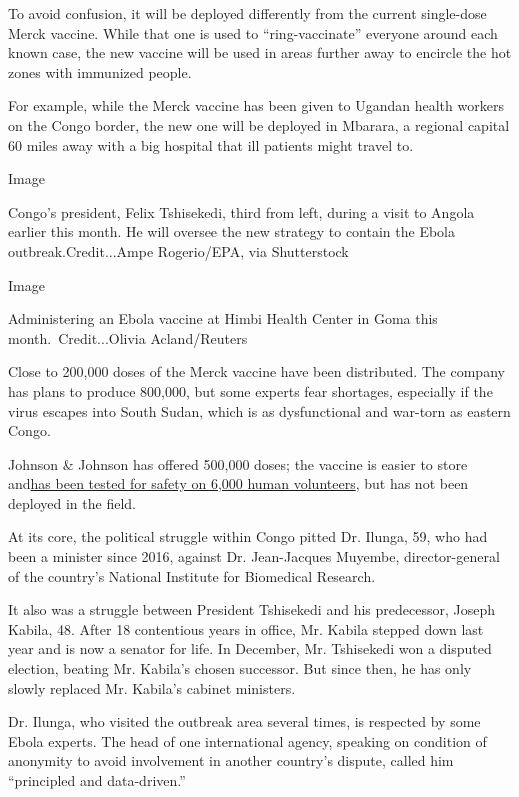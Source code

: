To avoid confusion, it will be deployed differently from the current
single-dose Merck vaccine. While that one is used to ``ring-vaccinate''
everyone around each known case, the new vaccine will be used in areas
further away to encircle the hot zones with immunized people.

For example, while the Merck vaccine has been given to Ugandan health
workers on the Congo border, the new one will be deployed in Mbarara, a
regional capital 60 miles away with a big hospital that ill patients
might travel to.

Image

Congo's president, Felix Tshisekedi, third from left, during a visit to
Angola earlier this month. He will oversee the new strategy to contain
the Ebola outbreak.Credit...Ampe Rogerio/EPA, via Shutterstock

Image

Administering an Ebola vaccine at Himbi Health Center in Goma this
month.~Credit...Olivia Acland/Reuters

Close to 200,000 doses of the Merck vaccine have been distributed. The
company has plans to produce 800,000, but some experts fear shortages,
especially if the virus escapes into South Sudan, which is as
dysfunctional and war-torn as eastern Congo.

Johnson \& Johnson has offered 500,000 doses; the vaccine is easier to
store
and\href{https://www.reuters.com/article/us-health-ebola-vaccine/deployment-of-second-ebola-vaccine-would-not-be-quick-fix-experts-warn-idUSKCN1UK1KR}{has
been tested for safety on 6,000 human volunteers}, but has not been
deployed in the field.

At its core, the political struggle within Congo pitted Dr. Ilunga, 59,
who had been a minister since 2016, against Dr. Jean-Jacques Muyembe,
director-general of the country's National Institute for Biomedical
Research.

It also was a struggle between President Tshisekedi and his predecessor,
Joseph Kabila, 48. After 18 contentious years in office, Mr. Kabila
stepped down last year and is now a senator for life. In December, Mr.
Tshisekedi won a disputed election, beating Mr. Kabila's chosen
successor. But since then, he has only slowly replaced Mr. Kabila's
cabinet ministers.

Dr. Ilunga, who visited the outbreak area several times, is respected by
some Ebola experts. The head of one international agency, speaking on
condition of anonymity to avoid involvement in another country's
dispute, called him ``principled and data-driven.''

